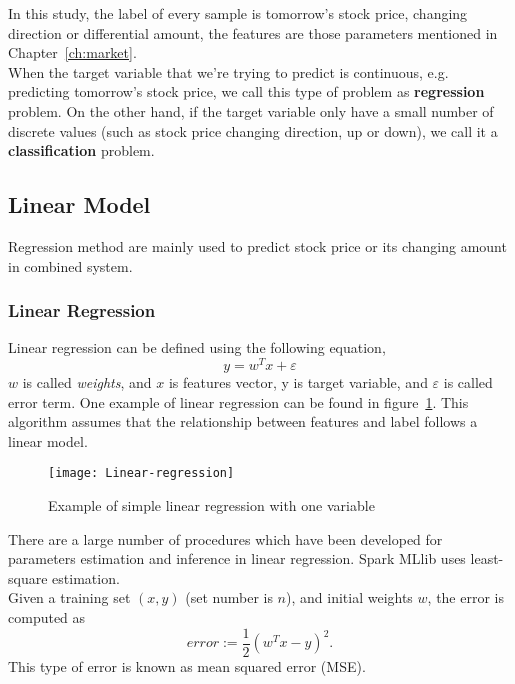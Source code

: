 In this study, the label of every sample is tomorrow's stock price, changing direction or differential amount, the features are those parameters mentioned in Chapter~\ref{ch:market}.\\


When the target variable that we're trying to predict is continuous, e.g. predicting tomorrow's stock price, we call this type of problem as \textbf{regression} problem. On the other hand, if the target variable only have a small number of discrete values (such as stock price changing direction, up or down), we call it a \textbf{classification} problem.


\subsection{Linear Model}
Regression method are mainly used to predict stock price or its changing amount in combined system.

\subsubsection{Linear Regression}
Linear regression can be defined using the following equation,
\begin{equation}
	y=w^Tx + \varepsilon
\end{equation}
$ w $ is called \emph{weights}, and $ x $ is features vector, y is target variable, and $ \varepsilon $ is called error term. One example of linear regression can be found in figure~\ref{fg:linear_regression}. This algorithm assumes that the relationship between features and label follows a linear model.
\begin{figure}[h]
	\centering
	\texttt{[image: Linear-regression]}
	\caption{Example of simple linear regression with one variable}
	\label{fg:linear_regression}
\end{figure}


There are a large number of procedures which have been developed for parameters estimation and inference in linear regression. Spark MLlib uses least-square estimation\cite{7_mllib_linear_methods}.\\


Given a training set $ (x, y) $ (set number is $ n $), and initial weights $ w $, the error is computed as
\begin{equation}
error := \frac{1}{2} (w^T x - y)^2.
\label{eq:error_equation}
\end{equation}
This type of error is known as mean squared error (MSE).\\

